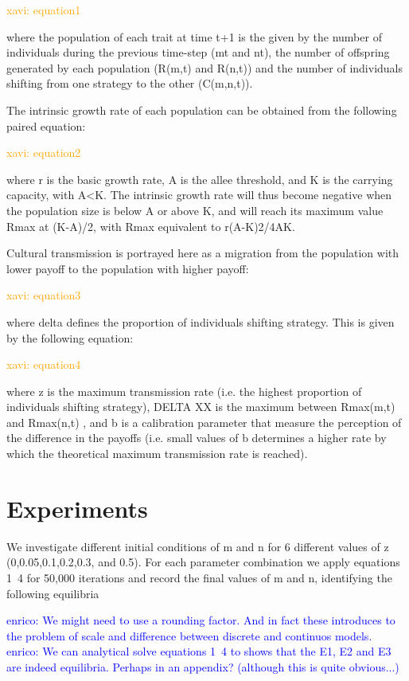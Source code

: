 \documentclass[preprint,authoryear]{elsarticle}
\newcommand{\memo}[2]{\textcolor{#1}{#2}}
\newcommand{\xavi}[1]{\memo{orange}{xavi: #1\\}}
\newcommand{\enrico}[1]{\memo{blue}{enrico: #1\\}}
\begin{document}
\xavi{equation1}

where the population of each trait at time t+1 is the given by the number of individuals during the previous time-step (mt and nt), the number of offspring generated by each population (R(m,t) and R(n,t)) and the number of individuals shifting from one strategy to the other (C(m,n,t)).

The intrinsic growth rate of each population can be obtained from the following paired equation:

\xavi{equation2}

where r is the basic growth rate, A is the allee threshold, and K is the carrying capacity, with A<K.  The intrinsic growth rate will thus become negative when the population size is below A or above K, and will reach its maximum value Rmax at (K-A)/2, with Rmax equivalent to r(A-K)2/4AK. 

Cultural transmission is portrayed here as a migration from the population with lower payoff to the population with higher payoff:

\xavi{equation3}

where delta defines the proportion of individuals shifting strategy. This is given by the following equation:

\xavi{equation4}

where z is the maximum transmission rate (i.e. the highest proportion of individuals shifting strategy), DELTA XX is the maximum between Rmax(m,t) and Rmax(n,t) , and b is a calibration parameter that measure the perception of the difference in the payoffs (i.e. small values of b determines a higher rate by which the theoretical maximum transmission rate is reached).

\section{Experiments}

We investigate different initial conditions of m and n for 6 different values of z (0,0.05,0.1,0.2,0.3, and 0.5). For each parameter combination we apply equations 1~4 for 50,000 iterations and record the final values of m and n, identifying the following equilibria

\enrico{We might need to use a rounding factor. And in fact these introduces to the problem of scale and difference between discrete and continuos  models.}
\enrico{We can analytical solve equations 1~4 to shows that the E1, E2 and E3 are indeed equilibria. Perhaps in an appendix? (although this is quite obvious...)}
\end{document}

